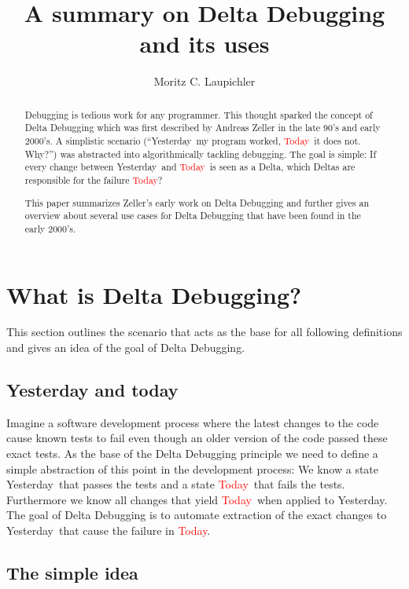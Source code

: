 \documentclass[a4paper,UKenglish]{lipics-v2018}
\title{A summary on Delta Debugging and its uses}
\author{Moritz C. Laupichler}{Department of Informatics, Karlsruhe Institute of Technology, Germany}{moritz.laupichler@student.kit.edu}{}{}
\newcommand{\green}[1]{\textcolor{td-green}{#1}}
\newcommand{\red}[1]{\textcolor{red}{#1}}
\newcommand{\yd}[0]{\green{Yesterday}}
\newcommand{\td}[0]{\red{Today}}
\begin{document}
\maketitle

\begin{abstract}
	Debugging is tedious work for any programmer. This thought sparked the concept of Delta Debugging which was first described by Andreas Zeller in the late 90's and early 2000's. A simplistic scenario (``\yd\ my program worked, \td\ it does not. Why?'') was abstracted into algorithmically tackling debugging. The goal is simple: If every change between \yd\ and \td\ is seen as a Delta, which Deltas are responsible for the failure \td?

	This paper summarizes Zeller's early work on Delta Debugging \cite{Zeller:1999:YMP:318774.318946} and further gives an overview about several use cases for Delta Debugging that have been found in the early 2000's. 
\end{abstract}
	
\section{What is Delta Debugging?}
\label{sec:what_is_dd}

This section outlines the scenario that acts as the base for all following definitions and gives an idea of the goal of Delta Debugging.

\subsection{Yesterday and today}
\label{ydandtd}

Imagine a software development process where the latest changes to the code cause known tests to fail even though an older version of the code passed these exact tests. As the base of the Delta Debugging principle we need to define a simple abstraction of this point in the development process: We know a state \yd\ that passes the tests and a state \td\ that fails the tests. Furthermore we know all changes that yield \td\ when applied to \yd.\\
The goal of Delta Debugging is to automate extraction of the exact changes to \yd\ that cause the failure in \td.  

\subsection{The simple idea}
\label{ddidea}
\end{document}

